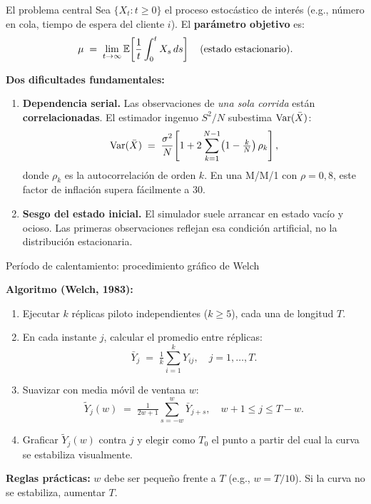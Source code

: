 \documentclass[aspectratio=1610, 10pt]{beamer}
\begin{document}
\begin{frame}{El problema central}
Sea $\{X_t : t \geq 0\}$ el proceso estocástico de interés (e.g., número en cola, tiempo de espera del cliente $i$). El \textbf{parámetro objetivo} es:
\[
\mu \;=\; \lim_{t\to\infty} \mathbb{E}\!\left[\frac{1}{t}\int_0^t X_s\,ds\right] \quad \text{(estado estacionario)}.
\]

\vspace{0.2cm}
\textbf{Dos dificultades fundamentales:}
\begin{enumerate}
\item \textbf{Dependencia serial.} Las observaciones de \emph{una sola corrida} están \textbf{correlacionadas}. El estimador ingenuo $S^2/N$ subestima $\operatorname{Var}(\bar X)$:
\[
\operatorname{Var}(\bar X) \;=\; \frac{\sigma^2}{N}\!\left[1 + 2\sum_{k=1}^{N-1}\!\left(1-\tfrac{k}{N}\right)\rho_k\right],
\]
donde $\rho_k$ es la autocorrelación de orden $k$. En una M/M/1 con $\rho=0{,}8$, este factor de inflación supera fácilmente a $30$.

\item \textbf{Sesgo del estado inicial.} El simulador suele arrancar en estado vacío y ocioso. Las primeras observaciones reflejan esa condición artificial, no la distribución estacionaria.
\end{enumerate}
\end{frame}

\begin{frame}{Período de calentamiento: procedimiento gráfico de Welch}
\begin{metodobox}[Procedimiento]
\textbf{Algoritmo (Welch, 1983):}
\begin{enumerate}
\item Ejecutar $k$ réplicas piloto independientes ($k\geq 5$), cada una de longitud $T$.
\item En cada instante $j$, calcular el promedio entre réplicas:
\[
\bar Y_j \;=\; \tfrac{1}{k}\textstyle\sum_{i=1}^{k} Y_{ij}, \quad j=1,\ldots,T.
\]
\item Suavizar con media móvil de ventana $w$:
\[
\widetilde Y_j(w) \;=\; \tfrac{1}{2w+1}\textstyle\sum_{s=-w}^{w} \bar Y_{j+s}, \quad w+1 \le j \le T-w.
\]
\item Graficar $\widetilde Y_j(w)$ contra $j$ y elegir como $T_0$ el punto a partir del cual la curva se estabiliza visualmente.
\end{enumerate}
\end{metodobox}

\vspace{0.1cm}
\footnotesize
\textbf{Reglas prácticas:} $w$ debe ser pequeño frente a $T$ (e.g., $w = T/10$). Si la curva no se estabiliza, aumentar $T$.
\end{frame}
\end{document}
